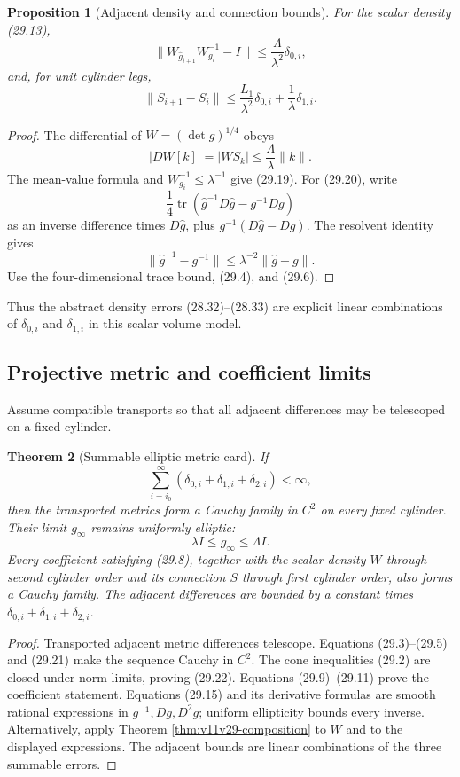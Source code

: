 \documentclass[11pt]{article}
\newtheorem{theorem}{Theorem}[section]
\newtheorem{proposition}[theorem]{Proposition}
\begin{document}
\begin{proposition}[Adjacent density and connection bounds]
\label{prop:v11v29-density-adjacent}
For the scalar density (29.13),
\[
 \|W_{\widehat g_{i+1}}W_{g_i}^{-1}-I\|
 \leq
 \frac{\Lambda}{\lambda^2}\delta_{0,i},
 \tag{29.19}
\]
and, for unit cylinder legs,
\[
 \|S_{i+1}-S_i\|
 \leq
 \frac{L_1}{\lambda^2}\delta_{0,i}
 +\frac1\lambda\delta_{1,i}.
 \tag{29.20}
\]
\end{proposition}

\begin{proof}
The differential of \(W=(\det g)^{1/4}\) obeys
\[
 |DW[k]|=|W S_k|
 \leq\frac{\Lambda}{\lambda}\|k\|.
\]
The mean-value formula and \(W_{g_i}^{-1}\leq\lambda^{-1}\) give
(29.19).  For (29.20), write
\[
 \frac14\operatorname{tr}
 \left(
 \widehat g^{-1}D\widehat g
 -g^{-1}Dg
 \right)
\]
as an inverse difference times \(D\widehat g\), plus
\(g^{-1}(D\widehat g-Dg)\).  The resolvent identity gives
\[
 \|\widehat g^{-1}-g^{-1}\|
 \leq\lambda^{-2}\|\widehat g-g\|.
\]
Use the four-dimensional trace bound, (29.4), and (29.6).
\end{proof}

Thus the abstract density errors (28.32)--(28.33) are explicit linear
combinations of \(\delta_{0,i}\) and \(\delta_{1,i}\) in this scalar
volume model.

\subsection{Projective metric and coefficient limits}

Assume compatible transports so that all adjacent differences may be
telescoped on a fixed cylinder.

\begin{theorem}[Summable elliptic metric card]
\label{thm:v11v29-summable-card}
If
\[
 \sum_{i=i_0}^{\infty}
 \left(\delta_{0,i}+\delta_{1,i}+\delta_{2,i}\right)<\infty,
 \tag{29.21}
\]
then the transported metrics form a Cauchy family in \(C^2\) on every
fixed cylinder.  Their limit \(g_\infty\) remains uniformly elliptic:
\[
 \lambda I\leq g_\infty\leq\Lambda I.
 \tag{29.22}
\]
Every coefficient satisfying (29.8), together with the scalar density
\(W\) through second cylinder order and its connection \(S\) through first cylinder order,
also forms a Cauchy family.  The adjacent differences are bounded by a
constant times
\(\delta_{0,i}+\delta_{1,i}+\delta_{2,i}\).
\end{theorem}

\begin{proof}
Transported adjacent metric differences telescope.  Equations
(29.3)--(29.5) and (29.21) make the sequence Cauchy in \(C^2\).
The cone inequalities (29.2) are closed under norm limits, proving
(29.22).  Equations (29.9)--(29.11) prove the coefficient statement.
Equations (29.15) and its derivative formulas are smooth rational
expressions in \(g^{-1},Dg,D^2g\); uniform ellipticity bounds every
inverse.  Alternatively, apply Theorem
\ref{thm:v11v29-composition} to \(W\) and to the displayed expressions.
The adjacent bounds are linear combinations of the three summable
errors.
\end{proof}
\end{document}
